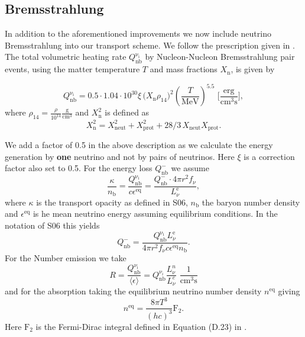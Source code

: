 \documentclass[fleqn,usenatbib]{mnras}
\begin{document}
\subsection{Bremsstrahlung}

In addition to the aforementioned improvements we now include neutrino Bremsstrahlung into our transport scheme. We follow the prescription given in \cite{Burrows2006}.
The total volumetric heating rate $ Q_{\mathrm{nb}}^{\mathrm{\nu_i}}$ by Nucleon-Nucleon Bremsstrahlung pair events, using the matter temperature $T$ and mass fractions $X_{\mathrm{n}}$, is given by

\begin{equation}
Q_{\mathrm{nb}}^{\mathrm{\nu_i}} = 0.5\cdot 1.04\cdot 10^{30} \xi \, \big(X_{\mathrm{n}}\rho_{14}\big)^2 (\frac{T}{\mathrm{MeV}})^{5.5} \,\, \Big[\frac{\mathrm{erg}}{\mathrm{cm^3s}}\Big],
\end{equation}
where $\rho_{14} = \frac{\rho}{10^{14}} \mathrm{\frac{g}{cm^3}} $
and $X_{\mathrm{n}}^2$ is defined as
\begin{equation*}
X_{\mathrm{n}}^2 = X_{\mathrm{neut}}^2 + X_{\mathrm{prot}}^2 + 28/3\, X_{\mathrm{neut}}X_{\mathrm{prot}}.
\end{equation*}

We add a factor of 0.5 in the above description as we calculate the energy generation by \textbf{one} neutrino and not by pairs of neutrinos. Here $\xi$ is a correction factor also set to 0.5.
For the energy loss $Q_{\mathrm{nb}}^{-}$ we assume
\begin{equation}
\frac{\kappa}{n_{\mathrm{b}}} = \frac{Q_{\mathrm{nb}}^{\mathrm{\nu_i}}}{c \epsilon^{\mathrm{eq}}} = \frac{Q_{\mathrm{nb}}^{-}\cdot 4\pi r^2 f_{\nu}}{L_{\nu}^{\mathrm{e}}}, 
\end{equation}
where $\kappa$ is the transport opacity as defined in S06, $n_{\text{b}}$ the baryon number density and $\epsilon^{\mathrm{eq}}$ is he mean neutrino energy assuming equilibrium conditions.
In the notation of S06 this yields
\begin{equation}
Q_{\mathrm{nb}}^{-} = \frac{Q_{\mathrm{nb}}^{\mathrm{\nu_i}} L_{\nu}^{\mathrm{e}} }{4\pi r^2 f_{\nu} c \epsilon^{\mathrm{eq}} n_{\mathrm{b}}}.
\end{equation}
For the Number emission we take
\begin{equation}
R=\frac{Q_{\mathrm{nb}}^{\nu_{\mathrm{i}}}}{\langle \epsilon \rangle} = Q_{\mathrm{nb}}^{\nu_i} \frac{L_{\nu}^n }{L_{\nu}^e }\,\, \mathrm{\frac{1}{cm^3s}}
\end{equation}
and for the absorption taking the equilibrium neutrino number density $n^{\mathrm{eq}}$ giving
\begin{equation}
n^{\mathrm{eq}} = \frac{8\pi T^3}{(hc)^3}\mathrm{F}_2.
\end{equation}
Here $\mathrm{F}_2$ is the Fermi-Dirac integral defined in Equation (D.23) in \cite{Scheck2006}.
\end{document}
